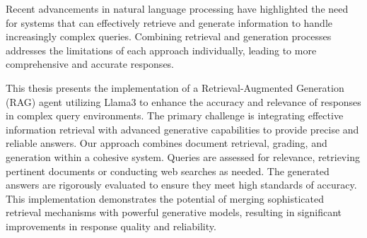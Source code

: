 Recent advancements in natural language processing have highlighted the need for systems that can effectively retrieve and generate information to handle increasingly complex queries. Combining retrieval and generation processes addresses the limitations of each approach individually, leading to more comprehensive and accurate responses.

\hfill

This thesis presents the implementation of a Retrieval-Augmented Generation (RAG) agent utilizing Llama3 to enhance the accuracy and relevance of responses in complex query environments. The primary challenge is integrating effective information retrieval with advanced generative capabilities to provide precise and reliable answers. Our approach combines document retrieval, grading, and generation within a cohesive system. Queries are assessed for relevance, retrieving pertinent documents or conducting web searches as needed. The generated answers are rigorously evaluated to ensure they meet high standards of accuracy. This implementation demonstrates the potential of merging sophisticated retrieval mechanisms with powerful generative models, resulting in significant improvements in response quality and reliability.